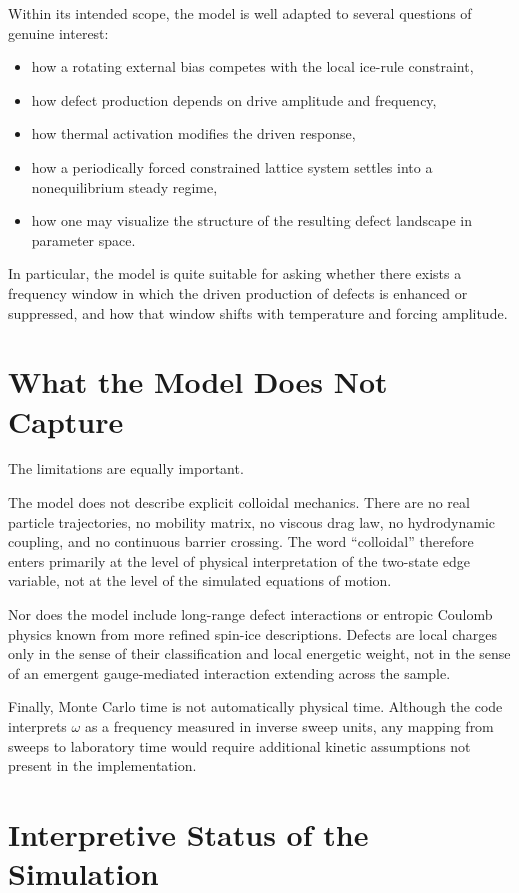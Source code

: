 \documentclass[11pt]{article}
\begin{document}
Within its intended scope, the model is well adapted to several questions of
genuine interest:

\begin{itemize}
\item how a rotating external bias competes with the local ice-rule constraint,
\item how defect production depends on drive amplitude and frequency,
\item how thermal activation modifies the driven response,
\item how a periodically forced constrained lattice system settles into a
nonequilibrium steady regime,
\item how one may visualize the structure of the resulting defect landscape in
parameter space.
\end{itemize}

In particular, the model is quite suitable for asking whether there exists a
frequency window in which the driven production of defects is enhanced or
suppressed, and how that window shifts with temperature and forcing amplitude.

\section{What the Model Does Not Capture}

The limitations are equally important.

The model does not describe explicit colloidal mechanics. There are no real
particle trajectories, no mobility matrix, no viscous drag law, no hydrodynamic
coupling, and no continuous barrier crossing. The word ``colloidal'' therefore
enters primarily at the level of physical interpretation of the two-state edge
variable, not at the level of the simulated equations of motion.

Nor does the model include long-range defect interactions or entropic Coulomb
physics known from more refined spin-ice descriptions. Defects are local charges
only in the sense of their classification and local energetic weight, not in the
sense of an emergent gauge-mediated interaction extending across the sample.

Finally, Monte Carlo time is not automatically physical time. Although the code
interprets $\omega$ as a frequency measured in inverse sweep units, any mapping
from sweeps to laboratory time would require additional kinetic assumptions not
present in the implementation.

\section{Interpretive Status of the Simulation}
\end{document}
